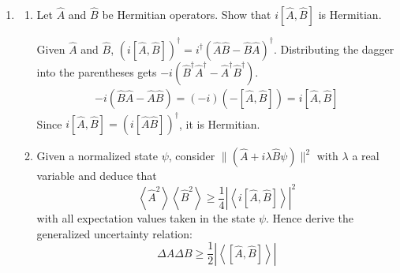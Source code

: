 \documentclass[10pt,letterpaper]{article}
\begin{document}
\begin{enumerate}
\begin{enumerate}[(a)]
\color{violet}
The commutation relation is set up as $\left[ \hat{H}, \hat{x} \right] = \left( \left[ \frac{\hat{p}^{2}}{2m}, \hat{x} \right] + \left[ \frac{m\omega^{2}x^{2}}{2}, \hat{x} \right] \right)\ket{\chi_{n}}$. This would be simplified down to $\left[ \frac{\hat{p}^{2}}{2m}, \hat{x} \right]\ket{\chi_{n}}$, since the potential and position operator commute ($\frac{m\omega^{2}}{2} \left[ x^{2}, \hat{x} \right] = 0$). Using the canonical commutation relation, the commutation between the kinetic energy and position operator is simplified down to $\frac{-i\hbar}{m}\hat{p}\ket{\chi_{n}}$. Since the results from (a) shows that $\left\langle \left[ \hat{H}, \hat{A} \right] \right\rangle_{\chi} = 0$ for any operator $\hat{A}$, that means the $\braket{\frac{-i\hbar}{m}\hat{p}\ket{\chi_{n}}}$ is 0. Hence, $\braket{\hat{p}}_{\chi} = 0$.  
\color{black}

\item Now assume further that $U(\hat{x}) = k\hat{x}^{n}$ (with $k$ and $n$ constants). By taking $\hat{A} = \hat{x}\hat{p}$, show that
$$\braket{\hat{T}}_{\chi} = \frac{n}{n + 2}E, \text{  and  } \braket{\hat{U}}_{\chi} = \frac{2}{n + 2}E$$ 

\end{enumerate}

\item 

\begin{enumerate}

\item Let $\hat{A}$ and $\hat{B}$ be Hermitian operators. Show that $i[\hat{A}, \hat{B}]$ is Hermitian. 

\color{violet}
Given $\hat{A}$ and $\hat{B}$, $(i[ \hat{A}, \hat{B} ])^{\dagger} = i^{\dagger}(\hat{A}\hat{B} - \hat{B}\hat{A})^{\dagger}$. Distributing the dagger into the parentheses gets $-i(\hat{B}^{\dagger}\hat{A}^{\dagger} - \hat{A}^{\dagger}\hat{B}^{\dagger})$.  
\begin{gather*}
-i(\hat{B}\hat{A} - \hat{A}\hat{B}) = (-i)(-[\hat{A}, \hat{B}]) = i[\hat{A}, \hat{B}]
\end{gather*}
Since $i[\hat{A}, \hat{B}] = (i[\hat{A}\hat{B}])^{\dagger}$, it is Hermitian. 
\color{black}

\item Given a normalized state $\psi$, consider $\|(\hat{A} + i\lambda\hat{B}\psi)\|^{2}$ with $\lambda$ a real variable and deduce that 
$$\left\langle \hat{A}^{2} \right\rangle \left\langle \hat{B}^{2} \right\rangle \geq \frac{1}{4}\left\vert \left\langle i\left[ \hat{A}, \hat{B} \right] \right\rangle \right\vert^{2}$$
with all expectation values taken in the state $\psi$. Hence derive the generalized uncertainty relation:
$$\Delta A \Delta B \geq \frac{1}{2} \left\vert \left\langle \left[ \hat{A}, \hat{B} \right] \right\rangle \right\vert$$


\end{enumerate}
\end{enumerate}
\end{document}
